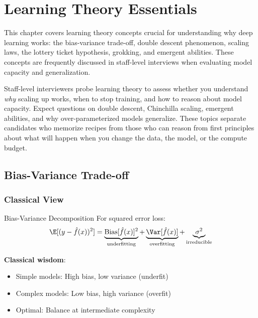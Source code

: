 \chapter{Learning Theory Essentials}
\label{chap:learning_theory}

\begin{tldr}
This chapter covers learning theory concepts crucial for understanding why deep learning works: the bias-variance trade-off, double descent phenomenon, scaling laws, the lottery ticket hypothesis, grokking, and emergent abilities. These concepts are frequently discussed in staff-level interviews when evaluating model capacity and generalization.
\end{tldr}

Staff-level interviewers probe learning theory to assess whether you understand \textit{why} scaling up works, when to stop training, and how to reason about model capacity. Expect questions on double descent, Chinchilla scaling, emergent abilities, and why over-parameterized models generalize. These topics separate candidates who memorize recipes from those who can reason from first principles about what will happen when you change the data, the model, or the compute budget.

\bigskip

\section{Bias-Variance Trade-off}
\label{sec:bias_variance}

\subsection{Classical View}

\begin{mathresult}{Bias-Variance Decomposition}
For squared error loss:
\begin{equation}
\E[(y - \hat{f}(x))^2] = \underbrace{\text{Bias}[\hat{f}(x)]^2}_{\text{underfitting}} + \underbrace{\Var[\hat{f}(x)]}_{\text{overfitting}} + \underbrace{\sigma^2}_{\text{irreducible}}
\end{equation}
\end{mathresult}

\textbf{Classical wisdom}:
\begin{itemize}
    \item Simple models: High bias, low variance (underfit)
    \item Complex models: Low bias, high variance (overfit)
    \item Optimal: Balance at intermediate complexity
\end{itemize}

